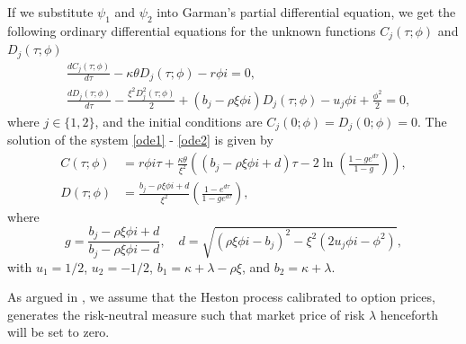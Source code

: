 If we substitute $\psi_{1}$ and $\psi_{2}$ into Garman's partial differential equation, we get the following ordinary differential equations for the unknown functions $C_{j}(\tau;\phi)$ and $D_{j}(\tau;\phi)$
\begin{align}
    &\frac{dC_{j}(\tau;\phi)}{d\tau}-\kappa\theta D_{j}(\tau;\phi) - r\phi i=0,\label{ode1}\\
    &\frac{dD_{j}(\tau;\phi)}{d\tau}-\frac{\xi^{2}D_{j}^{2}(\tau;\phi)}{2} + (b_{j}-\rho\xi\phi i)D_{j}(\tau;\phi) - u_{j}\phi i + \frac{\phi^2}{2}=0,\label{ode2}
\end{align}
where $j\in\{1,2\}$, and the initial conditions are $C_{j}(0;\phi)=D_{j}(0;\phi)=0$. The solution of the system \eqref{ode1} - \eqref{ode2} is given by
\begin{align}
    C(\tau;\phi)&=r\phi i\tau+\frac{\kappa\theta}{\xi^{2}}\left((b_{j}-\rho\xi \phi i+d)\tau -2\ln\left(\frac{1-ge^{d\tau}}{1-g}\right)\right),\\
    D(\tau;\phi)&=\frac{b_{j}-\rho\xi\phi i+d}{\xi^{2}}\left(\frac{1-e^{d\tau}}{1-ge^{d\tau}}\right),
\end{align}
where 
\begin{equation*}
    g=\frac{b_{j}-\rho\xi\phi i+d}{b_{j}-\rho\xi\phi i-d}, \quad d=\sqrt{(\rho\xi\phi i-b_{j})^{2}-\xi^{2}(2u_{j}\phi i-\phi^{2})},
\end{equation*}
with $u_{1}=1/2$, $u_{2}=-1/2$, $b_{1}=\kappa + \lambda-\rho\xi$, and $b_{2}=\kappa + \lambda$. 

As argued in \cite[p.~16]{volsurface}, we assume that the Heston process calibrated to option prices, generates the risk-neutral measure such that market price of risk $\lambda$ henceforth will be set to zero. 

